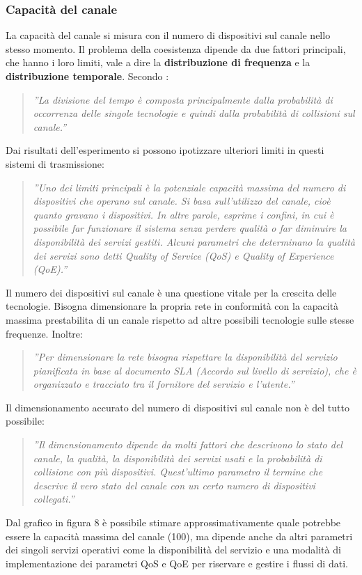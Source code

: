 \documentclass[a4paper]{report} %
\begin{document}
\subsubsection{Capacità del canale} 
La capacità del canale si misura con il numero di dispositivi sul canale nello stesso momento. Il problema della coesistenza dipende da due fattori principali, che hanno i loro limiti, vale a dire la \textbf{distribuzione di frequenza} e la \textbf{distribuzione temporale}. Secondo \cite{art:rif.46}:
\begin{quote}
	\textit{''La divisione del tempo è composta principalmente dalla probabilità di occorrenza delle singole tecnologie e quindi dalla probabilità di collisioni sul canale.''}
\end{quote}
Dai risultati dell'esperimento \cite{art:rif.46} si possono ipotizzare ulteriori limiti in questi sistemi di trasmissione:
\begin{quote}
	\textit{''Uno dei limiti principali è la potenziale capacità massima del numero di dispositivi che operano sul canale. Si basa sull'utilizzo del canale, cioè quanto gravano i dispositivi. In altre parole, esprime i confini, in cui è possibile far funzionare il sistema senza perdere qualità o far diminuire la disponibilità dei servizi gestiti. Alcuni parametri che determinano la qualità dei servizi sono detti Quality of Service (QoS) e Quality of Experience (QoE).''}
\end{quote}
Il numero dei dispositivi sul canale è una questione vitale per la crescita delle tecnologie. Bisogna dimensionare la propria rete in conformità con la capacità massima prestabilita di un canale rispetto ad altre possibili tecnologie sulle stesse frequenze. Inoltre:
\begin{quote}
	\textit{''Per dimensionare la rete bisogna rispettare la disponibilità del servizio pianificata in base al documento SLA (Accordo sul livello di servizio), che è organizzato e tracciato tra il fornitore del servizio e l'utente.''}
\end{quote}
Il dimensionamento accurato del numero di dispositivi sul canale non è del tutto possibile:
\begin{quote}
	\textit{''Il dimensionamento dipende da molti fattori che descrivono lo stato del canale, la qualità, la disponibilità dei servizi usati e la probabilità di collisione con più dispositivi. Quest'ultimo parametro il termine che descrive il vero stato del canale con un certo numero di dispositivi collegati.''}
\end{quote}
Dal grafico in figura 8 è possibile stimare approssimativamente quale potrebbe essere la capacità massima del canale (100), ma dipende anche da altri parametri dei singoli servizi operativi come la disponibilità del servizio e una modalità di implementazione dei parametri QoS e QoE per riservare e gestire i flussi di dati. 
\end{document}
